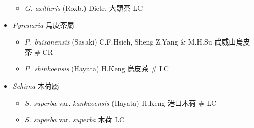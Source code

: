 \begin{itemize}
  \begin{itemize}
        \item[] \textit{G. axillaris} (Roxb.) Dietr.  大頭茶   LC
  \end{itemize}
 \item[] \textit{Pyrenaria} 烏皮茶屬
                                
  \begin{itemize}
        \item[] \textit{P. buisanensis} (Sasaki) C.F.Hsieh, Sheng Z.Yang \& M.H.Su  武威山烏皮茶  \# CR
        \item[] \textit{P. shinkoensis} (Hayata) H.Keng  烏皮茶  \# LC
  \end{itemize}
 \item[] \textit{Schima} 木荷屬
                                
  \begin{itemize}
        \item[] \textit{S. superba} var. \textit{kankaoensis} (Hayata) H.Keng  港口木荷  \# LC
        \item[] \textit{S. superba} var. \textit{superba}   木荷   LC
  \end{itemize}
  \end{itemize}
